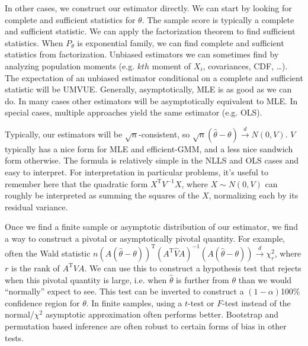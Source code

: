 \documentclass[12pt,english]{article}
\newcommand{\T}{\ensuremath{\text{T}}}
\begin{document}
In other cases, we construct our estimator directly. We can start by looking for complete and sufficient statistics for $\theta$. The sample score is typically a complete and sufficient statistic. We can apply the factorization theorem to find sufficient statistics. When $P_{\theta}$ is exponential family, we can find complete and sufficient statistics from factorization. Unbiased estimators we can sometimes find by analyzing population moments (e.g. $kth$ moment of $X_{i}$, covariances, CDF, \ldots). The expectation of an unbiased estimator conditional on a complete and sufficient statistic will be UMVUE. Generally, asymptotically, MLE is as good as we can do. In many cases other estimators will be asymptotically equivalent to MLE. In special cases, multiple approaches yield the same estimator (e.g. OLS).

Typically, our estimators will be $\sqrt{n}$-consistent, so $\sqrt{n}(\hat{\theta} - \theta) \overset{d}{\to} N(0, V)$. $V$ typically has a nice form for MLE and efficient-GMM, and a less nice sandwich form otherwise. The formula is relatively simple in the NLLS and OLS cases and easy to interpret. For interpretation in particular problems, it's useful to remember here that the quadratic form $X^{\T} V^{-1} X$, where $X \sim N(0, V)$ can roughly be interpreted as summing the squares of the $X$, normalizing each by its residual variance.

Once we find a finite sample or asymptotic distribution of our estimator, we find a way to construct a pivotal or asymptotically pivotal quantity. For example, often the Wald statistic $n (A(\hat{\theta} - \theta))^{\T} (A^{\T}\hat{V}A)^{-1} (A(\hat{\theta} - \theta)) \overset{d}{\to} \chi^{2}_{r}$, where $r$ is the rank of $A^{\T}VA$. We can use this to construct a hypothesis test that rejects when this pivotal quantity is large, i.e. when $\hat{\theta}$ is further from $\theta$ than we would ``normally'' expect to see. This test can be inverted to construct a $(1 - \alpha)$100\% confidence region for $\theta$. In finite samples, using a $t$-test or $F$-test instead of the normal/$\chi^{2}$ asymptotic approximation often performs better. Bootstrap and permutation based inference are often robust to certain forms of bias in other tests.
\end{document}
